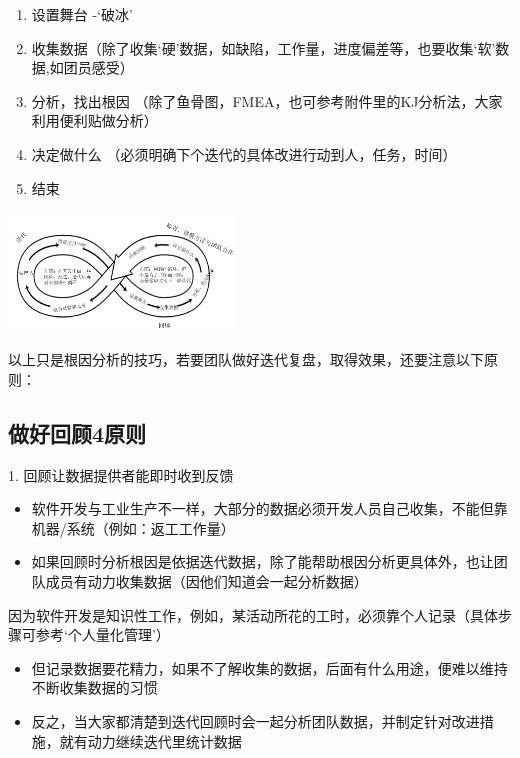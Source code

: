 \begin{enumerate}
\tightlist
\item
  设置舞台 -`破冰'
\item
  收集数据（除了收集`硬'数据，如缺陷，工作量，进度偏差等，也要收集`软'数据,如团员感受）
\item
  分析，找出根因
  （除了鱼骨图，FMEA，也可参考附件里的KJ分析法，大家利用便利贴做分析）
\item
  决定做什么 （必须明确下个迭代的具体改进行动到人，任务，时间）
\item
  结束
\end{enumerate}


\includegraphics[width=6cm]{RetrospectiveScreenshot_2021-09-21_173119.png}

以上只是根因分析的技巧，若要团队做好迭代复盘，取得效果，还要注意以下原则：

\hypertarget{ux505aux597dux56deux987e4ux539fux5219}{%
\subsection{做好回顾4原则}\label{ux505aux597dux56deux987e4ux539fux5219}}

1. 回顾让数据提供者能即时收到反馈\\


\begin{itemize}
\tightlist
\item
  软件开发与工业生产不一样，大部分的数据必须开发人员自己收集，不能但靠机器/系统（例如：返工工作量）
\item
  如果回顾时分析根因是依据迭代数据，除了能帮助根因分析更具体外，也让团队成员有动力收集数据（因他们知道会一起分析数据）
\end{itemize}

因为软件开发是知识性工作，例如，某活动所花的工时，必须靠个人记录（具体步骤可参考`个人量化管理'）

\begin{itemize}
\tightlist
\item
  但记录数据要花精力，如果不了解收集的数据，后面有什么用途，便难以维持不断收集数据的习惯
\item
  反之，当大家都清楚到迭代回顾时会一起分析团队数据，并制定针对改进措施，就有动力继续迭代里统计数据
\end{itemize}

